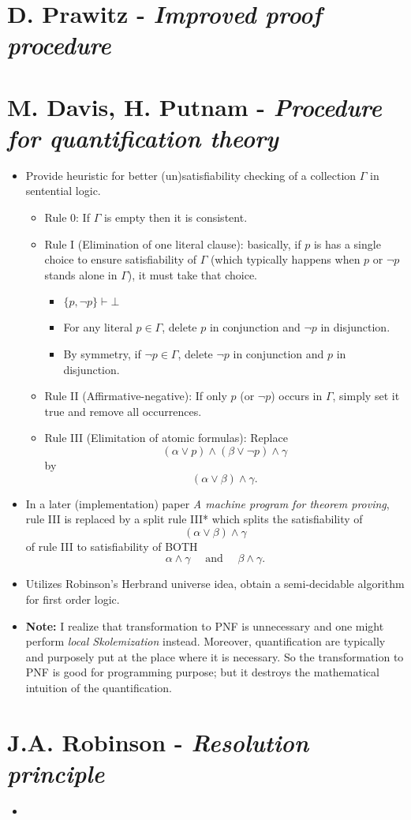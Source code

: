 \documentclass{article}
\begin{document}
\section{D. Prawitz - \emph{Improved proof procedure}}

\section{M. Davis, H. Putnam - \emph{Procedure for quantification theory}}

\begin{itemize}
\item Provide heuristic for better (un)satisfiability checking of a collection $\Gamma$ in sentential logic.
\begin{itemize}
\item Rule 0: If $\Gamma$ is empty then it is consistent.
\item Rule I (Elimination of one literal clause): basically, if $p$ is has a single choice to ensure satisfiability of $\Gamma$ (which typically happens when $p$ or $\neg p$ stands alone in $\Gamma$), it must take that choice.
\begin{itemize}
\item $\{p,\neg p\} \vdash \bot$
\item For any literal $p \in \Gamma$, delete $p$ in conjunction and $\neg p$ in disjunction.
\item By symmetry, if $\neg p \in \Gamma$, delete $\neg p$ in conjunction and $p$ in disjunction.
\end{itemize}
\item Rule II (Affirmative-negative): If only $p$ (or $\neg p$) occurs in $\Gamma$, simply set it true and remove all occurrences.
\item Rule III (Elimitation of atomic formulas): Replace $$(\alpha \lor p) \land (\beta \lor \neg p) \land \gamma$$ by $$(\alpha \lor \beta) \land \gamma.$$
\end{itemize}
\item In a later (implementation) paper \emph{A machine program for theorem proving}, rule III is replaced by a split rule III* which splits the satisfiability of $$(\alpha \lor \beta) \land \gamma$$ of rule III to satisfiability of BOTH
$$\alpha \land \gamma \quad \text{ and } \quad \beta \land \gamma.$$
\item Utilizes Robinson's Herbrand universe idea, obtain a semi-decidable algorithm for first order logic.
\item \textbf{Note:} I realize that transformation to PNF is unnecessary and one might perform \emph{local Skolemization} instead. Moreover, quantification are typically and purposely put at the place where it is necessary. So the transformation to PNF is good for programming purpose; but it destroys the mathematical intuition of the quantification.
\end{itemize}

\section{J.A. Robinson -  \emph{Resolution principle}}

\begin{itemize}
\item 	
\end{itemize}
\end{document}
